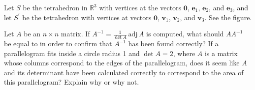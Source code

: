 \documentclass[11pt,answers]{exam} %
\renewcommand{\vec}[1]{\mathbf{#1}}
\newcommand{\adj}[1]{\textrm{adj}\, #1}
\begin{document}
\begin{questions}
    \question Let $S$ be the tetrahedron in $\mathbb{R}^3$ with vertices at the vectors $\vec{0}$, $\vec{e}_1$, $\vec{e}_2$, and $\vec{e}_3$, and let $S^\prime$ be the tetrahedron with vertices at vectors $\vec{0}$, $\vec{v}_1$, $\vec{v}_2$, and $\vec{v}_3$. See the figure.

    \question Let $A$ be an $n \times n$ matrix. If $A^{-1} = \frac{1}{\det{A}} \, \adj{A}$ is computed, what should $AA^{-1}$ be equal to in order to confirm that $A^{-1}$ has been found correctly?
    \question If a parallelogram fits inside a circle radius 1 and $\det{A} = 2$, where $A$ is a matrix whose columns correspond to the edges of the parallelogram, does it seem like $A$ and its determinant have been calculated correctly to correspond to the area of this parallelogram? Explain why or why not.

    \end{questions}
\end{document}
